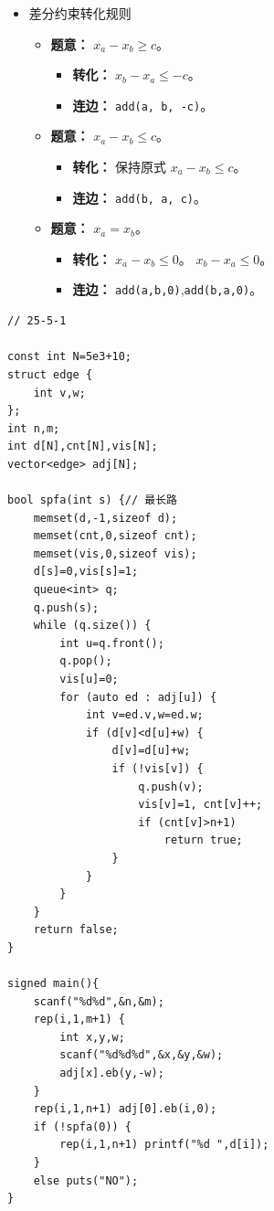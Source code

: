 \documentclass[a4paper,12pt]{article}
\begin{document}
\begin{itemize}
    \item 差分约束转化规则
    \begin{itemize}
        \item \textbf{题意：} $x_a - x_b \geq c$。
        \begin{itemize}
            \item \textbf{转化：} $x_b - x_a \leq -c$。
            \item \textbf{连边：} \texttt{add(a, b, -c)}。
        \end{itemize}
        
        \item \textbf{题意：} $x_a - x_b \leq c$。
        \begin{itemize}
            \item \textbf{转化：} 保持原式 $x_a - x_b \leq c$。
            \item \textbf{连边：} \texttt{add(b, a, c)}。
        \end{itemize}
        
        \item \textbf{题意：} $x_a = x_b$。
        \begin{itemize}
            \item \textbf{转化：} 
            $x_a - x_b \leq 0$。
            $x_b - x_a \leq 0$。
            \item \textbf{连边：} 
            \texttt{add(a,b,0)},\texttt{add(b,a,0)}。
        \end{itemize}
    \end{itemize}      
\end{itemize}

\begin{lstlisting}
// 25-5-1

const int N=5e3+10;
struct edge {
    int v,w;
};
int n,m;
int d[N],cnt[N],vis[N];
vector<edge> adj[N];

bool spfa(int s) {// 最长路
    memset(d,-1,sizeof d);
    memset(cnt,0,sizeof cnt);
    memset(vis,0,sizeof vis);
    d[s]=0,vis[s]=1;
    queue<int> q;
    q.push(s);
    while (q.size()) {
        int u=q.front();
        q.pop();
        vis[u]=0;
        for (auto ed : adj[u]) {
            int v=ed.v,w=ed.w;
            if (d[v]<d[u]+w) {
                d[v]=d[u]+w;
                if (!vis[v]) {
                    q.push(v);
                    vis[v]=1, cnt[v]++;
                    if (cnt[v]>n+1) 
                        return true;
                }
            } 
        }
    }
    return false;
}

signed main(){
    scanf("%d%d",&n,&m);
    rep(i,1,m+1) {
        int x,y,w;
        scanf("%d%d%d",&x,&y,&w);
        adj[x].eb(y,-w);
    }
    rep(i,1,n+1) adj[0].eb(i,0);
    if (!spfa(0)) {
        rep(i,1,n+1) printf("%d ",d[i]);
    }
    else puts("NO");
}    
\end{lstlisting}
\end{document}
